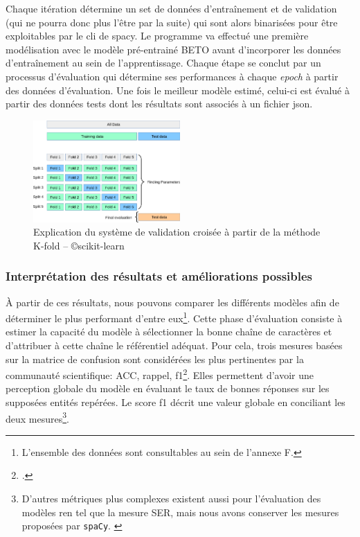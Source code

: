 	Chaque itération détermine un set de données d'entraînement et de validation (qui ne pourra donc plus l'être par la suite) qui sont alors binarisées pour être exploitables par le \gls{cli} de \gls{spacy}. Le programme va effectué une première modélisation avec le modèle pré-entrainé BETO avant d'incorporer les données d'entraînement au sein de l'apprentissage. Chaque étape se conclut par un processus d'évaluation qui détermine ses performances à chaque \textit{epoch} à partir des données d'évaluation. Une fois le meilleur modèle estimé, celui-ci est évalué à partir des données tests dont les résultats sont associés à un fichier \gls{json}.
	
	\begin{figure}[h!]
	    \centering
	    \includegraphics[width=0.5\textwidth]{annexes/schema/cross_validation.png}
	    \caption{Explication du système de validation croisée à partir de la méthode K-fold -- \copyright scikit-learn}
	    \label{fig:cross validation}
	\end{figure}
	
	\subsubsection{Interprétation des résultats et améliorations possibles}
	
	À partir de ces résultats, nous pouvons comparer les différents modèles afin de déterminer le plus performant d'entre eux\footnote{L'ensemble des données sont consultables au sein de l'annexe F.}. Cette phase d'évaluation consiste à estimer la capacité du modèle à sélectionner la bonne chaîne de caractères et d'attribuer à cette chaîne le référentiel adéquat. Pour cela, trois mesures basées sur la matrice de confusion sont considérées les plus pertinentes par la communauté scientifique: \gls{ACC}, \gls{rappel}, \gls{f1}\footcite{liSurveyDeepLearning2020}. Elles permettent d'avoir une perception globale du modèle en évaluant le taux de bonnes réponses sur les supposées entités repérées. Le score \gls{f1} décrit une valeur globale en conciliant les deux mesures\footnote{D'autres métriques plus complexes existent aussi pour l'évaluation des modèles \gls{ren} tel que la mesure SER, mais nous avons conserver les mesures proposées par \texttt{spaCy}. \cite{ehrmannNamedEntityRecognition2021}}.
	
